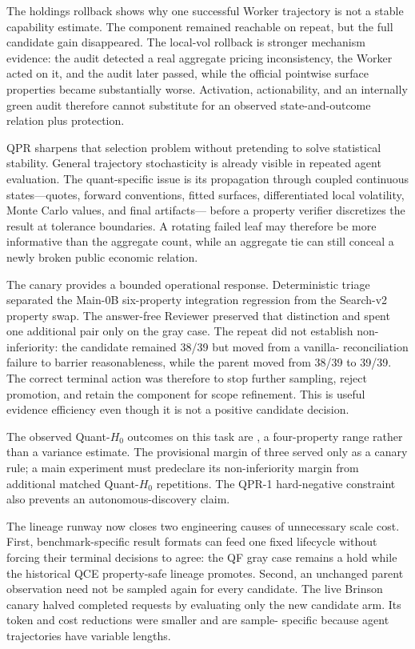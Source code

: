 The holdings rollback shows why one successful Worker trajectory is not a
stable capability estimate. The component remained reachable on repeat, but
the full candidate gain disappeared. The local-vol rollback is stronger
mechanism evidence: the audit detected a real aggregate pricing inconsistency,
the Worker acted on it, and the audit later passed, while the official
pointwise surface properties became substantially worse. Activation,
actionability, and an internally green audit therefore cannot substitute for
an observed state-and-outcome relation plus protection.

QPR sharpens that selection problem without pretending to solve statistical
stability. General trajectory stochasticity is already visible in repeated
agent evaluation. The quant-specific issue is its propagation through coupled
continuous states---quotes, forward conventions, fitted surfaces,
differentiated local volatility, Monte Carlo values, and final artifacts---
before a property verifier discretizes the result at tolerance boundaries. A
rotating failed leaf may therefore be more informative than the aggregate
count, while an aggregate tie can still conceal a newly broken public economic
relation.

The canary provides a bounded operational response. Deterministic triage
separated the Main-0B six-property integration regression from the Search-v2
property swap. The answer-free Reviewer preserved that distinction and spent
one additional pair only on the gray case. The repeat did not establish
non-inferiority: the candidate remained 38/39 but moved from a vanilla-
reconciliation failure to barrier reasonableness, while the parent moved from
38/39 to 39/39. The correct terminal action was therefore to stop further
sampling, reject promotion, and retain the component for scope refinement.
This is useful evidence efficiency even though it is not a positive candidate
decision.

The observed Quant-$H_0$ outcomes on this task are \QPRHZeroObserved{}, a
four-property range rather than a variance estimate. The provisional margin of
three served only as a canary rule; a main experiment must predeclare its
non-inferiority margin from additional matched Quant-$H_0$ repetitions. The
QPR-1 hard-negative constraint also prevents an autonomous-discovery claim.

The lineage runway now closes two engineering causes of unnecessary scale
cost. First, benchmark-specific result formats can feed one fixed lifecycle
without forcing their terminal decisions to agree: the QF gray case remains a
hold while the historical QCE property-safe lineage promotes. Second, an
unchanged parent observation need not be sampled again for every candidate.
The live Brinson canary halved completed requests by evaluating only the new
candidate arm. Its token and cost reductions were smaller and are sample-
specific because agent trajectories have variable lengths.

